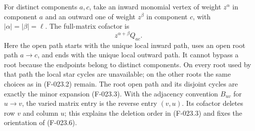 For distinct components \(a,c\), take an inward monomial
vertex of weight \(z^\alpha\) in component \(a\) and
an outward one of weight \(z^\beta\) in component \(c\),
with \(|\alpha|=|\beta|=\ell\). The full-matrix
cofactor is
\[
                                  z^{\alpha+\beta}Q_{ac}.
                                                               \tag{F-023.6}
\]
Here the open path starts with the unique local inward path,
uses an open root path \(a\to c\), and ends with the
unique local outward path. It cannot bypass a root because
the endpoints belong to distinct components. On every root
used by that path the local star cycles are unavailable;
on the other roots the same choices as in (F-023.2) remain.
The root open path and its disjoint cycles are exactly the
minor expansion (F-023.3). With the adjacency convention
\(B_{uv}\) for \(u\to v\), the varied matrix entry
is the reverse entry \((v,u)\). Its cofactor deletes row
\(v\) and column \(u\); this explains the deletion order
in (F-023.3) and fixes the orientation of (F-023.6).

